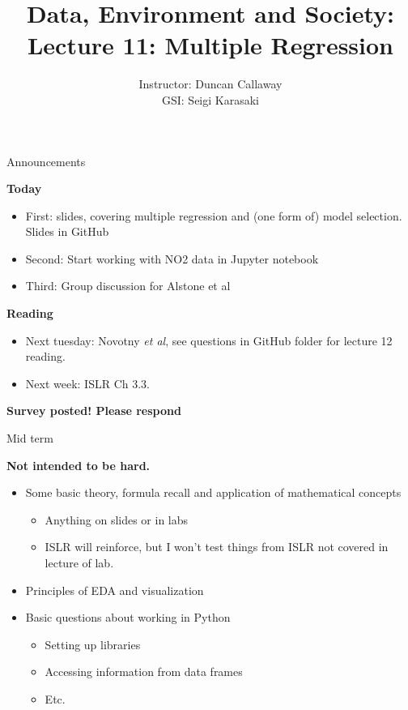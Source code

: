 \documentclass[aspectratio=169]{beamer}
\title[Lecture 11: Multiple Regression] %
{Data, Environment and Society: \\{Lecture 11: Multiple Regression}}
\author[ER190C: Data, Environment and Society] 
{Instructor: Duncan Callaway\\
GSI: Seigi Karasaki}
\institute[UC Berkeley] %
 {\small{ \bf September 27, 2018}}
\date[September 27, 2018]
\begin{document}
\begin{frame}
  \titlepage
\end{frame}

\begin{frame}{Announcements}

\textbf{Today}
\begin{itemize}
\item First: slides, covering multiple regression and (one form of) model selection.  Slides in GitHub
\item Second: Start working with NO2 data in Jupyter notebook
\item Third: Group discussion for Alstone et al
\end{itemize}

\textbf{Reading}
\begin{itemize}
\item Next tuesday: Novotny \textit{et al}, see questions in GitHub folder for lecture 12 reading.
\item Next week: ISLR Ch 3.3.
\end{itemize}

\textbf{Survey posted!  Please respond}
\end{frame}


\begin{frame}{Mid term}

\textbf{Not intended to be hard.  }
\begin{itemize}
\item Some basic theory, formula recall and application of mathematical concepts
\begin{itemize}
\item Anything on slides or in labs
\item ISLR will reinforce, but I won't test things from ISLR not covered in lecture of lab.
\end{itemize}
\item Principles of EDA and visualization
\item Basic questions about working in Python
\begin{itemize}
\item Setting up libraries
\item Accessing information from data frames
\item Etc.  
\end{itemize}
\end{itemize}

\end{frame}
\end{document}
